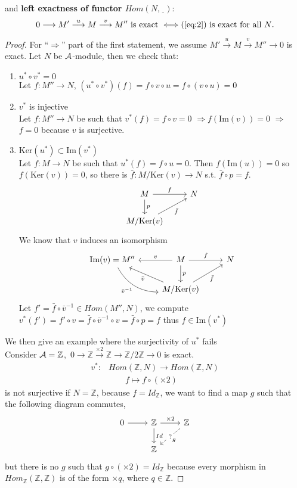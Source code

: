 \documentclass[11pt]{article}
\newcommand{\intg}{\mathbb Z}
\newcommand{\cala}{{\cal A}}
\newcommand{\rta}{\rightarrow}
\newcommand{\Lrta}{\Longrightarrow}
\newcommand{\lrta}{\longrightarrow}
\begin{document}
and 
\textbf{left exactness of functor $Hom(N,\underline{\ \ })$}:\\
$$
0\lrta M'\overset{u}{\lrta}M\overset{v}{\lrta}M'' \text{ is exact }\Longleftrightarrow (\ref{eq:2})\text{ is exact for all $N$}.
$$
\begin{proof}
For ``$\Lrta$'' part of the first statement, we assume $M'\overset{u}{\lrta}M\overset{v}{\lrta}M'' \lrta0$ is exact. 
Let $N$ be $\cala$-module, then we check that:
\begin{enumerate}
\item $u^*\circ v^*=0$\\
Let $f:M''\lrta N$, $(u^*\circ v^*)(f)=f\circ v\circ u=f\circ(v\circ u)=0$ 
\item $v^*$ is injective\\
Let $f:M''\lrta N$ be such that $v^*(f)=f\circ v=0$ $\Lrta f(\text{Im}(v))=0$ $\Lrta$ $f=0$ because $v$ is surjective.
\item $\text{Ker}(u^*)\subset \text{Im}(v^*)$\\
Let $f:M\lrta N$ be such that $u^*(f)=f\circ u=0$. Then $f(\text{Im}(u))=0$ so $f(\text{Ker}(v))=0$, so there is $\bar{f}:M/\text{Ker}(v)\lrta N$ s.t. $\bar{f}\circ p=f$.
\[
\begin{tikzcd}
 M  \arrow[r,"f"] \arrow[d,"p"] & N \\
M/\text{Ker}(v)\arrow[swap, ur,"\bar{f}"] &    
\end{tikzcd}
\]
We know that $v$ induces an isomorphism 
\[
\begin{tikzcd}
 \text{Im}(v)=M''\arrow[dr,swap,bend right,"\bar{v}^{-1}"]&
 M \arrow[swap,l,"v"] \arrow[r,"f"]  \arrow[d,"p"] & N \\
& M/\text{Ker}(v)\arrow[swap, ur,"\bar{f}"] \arrow[ul,"\bar{v}"]& 
\end{tikzcd}
\]
Let $f'=\bar{f}\circ \bar{v}^{-1}\in Hom(M'',N)$, we compute $v^*(f')=f'\circ v=\bar{f}\circ \bar{v}^{-1}\circ v=\bar{f}\circ p=f$ thus $f\in \text{Im}(v^*)$
\end{enumerate} 
We then give an example where the surjectivity of $u^*$ fails\\
Consider $\cala=\intg$,\ 
$0\lrta \intg\overset{\times 2}{\lrta}\intg\overset{\ }{\lrta}\intg/2\intg \lrta0$ is exact.
$$
\begin{aligned}
v^*: & Hom(\intg, N)\rta Hom(\intg,N) \\
 &\ \ \ \ \ \ \ \ \ f \longmapsto  f\circ(\times 2)
\end{aligned}
$$
 is not surjective if $N=\intg$, because $f=Id_\intg$, we want to find a map $g$ such that the following diagram commutes,
 \[
\begin{tikzcd}
0 \ar[r] & \intg\ar[r,"\times 2"]\ar[d,"Id"] & \intg \ar[dl, dashed,"?"description, "g"] \\
& \intg &
\end{tikzcd}
 \]
 but there is no $g$ such that $g\circ(\times 2)=Id_\intg$ because every morphism in $Hom_\intg(\intg,\intg)$ is of the form $\times q$, where $q\in\intg$.


\end{proof}
\end{document}
